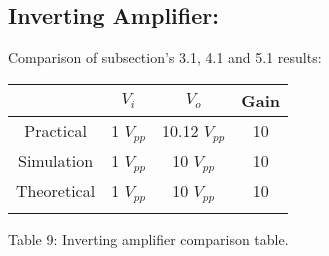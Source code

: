 \subsection{Inverting Amplifier:}

Comparison of subsection's 3.1, 4.1 and 5.1 results: \hfill \break

\begin{center}
\begin{tabular}[.5cm]{c c c c}
\toprule
\toprule
& \hspace{50pt} $V_{i}$ \hspace{50pt} & \hspace{50pt} $V_{o}$ \hspace{50pt} & \hspace{50pt}  {\bfseries Gain} \hspace{50pt}  \\
\midrule
\midrule
Practical & 1 $V_{pp}$ & 10.12 $V_{pp}$ & 10 \\
\cmidrule{1-4}
Simulation & 1 $V_{pp}$ & 10 $V_{pp}$ & 10 \\
\cmidrule{1-4}
Theoretical & 1 $V_{pp}$ & 10 $V_{pp}$ & 10 \\
\bottomrule
\linebreak
\end{tabular}
\linebreak Table 9: Inverting amplifier comparison table.
\end{center}

